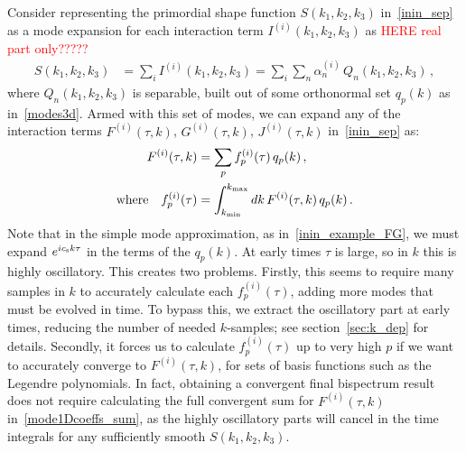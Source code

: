 Consider representing the primordial shape function $S(k_1, k_2, k_3)$ in~\eqref{inin_sep} as
a mode expansion for each interaction term $I^{(i)}(k_1, k_2,k_3)$ as
\textcolor{red}{HERE real part only?????}
\begin{align}\label{modeexp}
S(k_1, k_2,k_3) &= \sum_i I^{(i)}(k_1,k_2,k_3) =  \sum_i \sum_n \alpha_n^{(i)}  \, Q_n(k_1,k_2,k_3)\,,
\end{align}
where $Q_n(k_1,k_2,k_3)$ is separable, built out of some
orthonormal set $q_p(k)$ as in~\eqref{modes3d}.
Armed with this set of modes,
we can expand any of the interaction terms $F^{(i)}(\tau, k)$, $G^{(i)}(\tau, k)$, $J^{(i)}(\tau, k)$
in~\eqref{inin_sep} as:
\begin{align}
    F^{(i)}(\tau, k) &= \sum _p f_p^{(i)} (\tau) \, q_p(k)\,,\label{mode1Dcoeffs_sum}\\
    \text{where} \quad f_p^{(i)} (\tau)  &= \int _{k_\text{min}}^{k_\text{max}} dk \,F^{(i)}(\tau, k) \, q_p(k) \,.\label{mode1Dcoeffs_integral}
\end{align}
Note that in the simple mode approximation, as in~\eqref{inin_example_FG},
we must expand $e^{ic_{\rm s} k\tau}$ in the terms of the $q_p(k)$.
At early times $\tau$ is large, so in $k$ this is highly oscillatory.
This creates two problems. Firstly, this seems to require many samples
in $k$ to accurately calculate each $f_p^{(i)} (\tau)$,
adding more modes that must be evolved in time.
To bypass this, we extract the oscillatory part at
early times, reducing the number of needed
$k$-samples; see section~\eqref{sec:k_dep} for details.
Secondly, it forces us to calculate $f_p^{(i)} (\tau)$
up to very high $p$ if we want to accurately converge to $F^{(i)}(\tau, k)$,
for sets of basis functions such as the Legendre polynomials.
In fact, obtaining a convergent final bispectrum result
does not require calculating the full convergent sum
for $F^{(i)}(\tau, k)$ in~\eqref{mode1Dcoeffs_sum},
as the highly oscillatory parts will cancel in the time integrals
for any sufficiently smooth $S(k_1,k_2,k_3)$.

